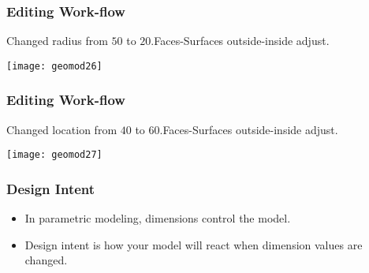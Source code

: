 \begin{frame}[fragile]\frametitle{Editing Work-flow}

		Changed radius from $50$ to $20$.Faces-Surfaces outside-inside adjust.
		
		
			\begin{center}
	\texttt{[image: geomod26]}
			\end{center}
\end{frame}

\begin{frame}[fragile]\frametitle{Editing Work-flow}

		Changed location from $40$ to $60$.Faces-Surfaces outside-inside adjust.

			\begin{center}
	\texttt{[image: geomod27]}
			\end{center}
\end{frame}

\begin{frame}[fragile]\frametitle{Design Intent}

\begin{itemize}
\item In parametric modeling, dimensions control the model.
\item Design intent is how your model will react when dimension values are changed. 
\end{itemize}
\end{frame}

